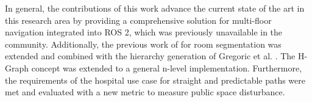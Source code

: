 In general, the contributions of this work advance the current state of the art in this research area by providing a comprehensive solution for multi-floor navigation integrated into ROS 2, which was previously unavailable in the community. Additionally, the previous work of \cite{ryu_hierarchical_2020} for room segmentation was extended and combined with the hierarchy generation of Gregoric et al. \cite{gregoric_autonomous_2022}. The H-Graph concept was extended to a general n-level implementation. Furthermore, the requirements of the hospital use case for straight and predictable paths were met and evaluated with a new metric to measure public space disturbance.